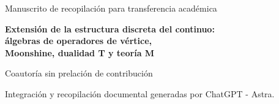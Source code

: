 \thispagestyle{plain}
\begin{center}
{\fontsize{10}{12}\selectfont Manuscrito de recopilación para transferencia académica\par}
\vspace{6mm}
{\fontsize{17}{20.5}\selectfont\bfseries
Extensión de la estructura discreta del continuo:\\
álgebras de operadores de vértice,\\
Moonshine, dualidad T y teoría M\par}
\vspace{11pt}
{\fontsize{11.5}{14}\selectfont\Autores\par}
\vspace{4pt}
{\fontsize{8}{10}\selectfont Coautoría sin prelación de contribución\par}
\vspace{3pt}
{\fontsize{8}{10}\selectfont Integración y recopilación documental generadas por ChatGPT - Astra.\par}
\end{center}
\vspace{7pt}
